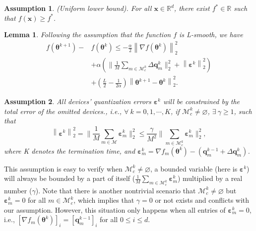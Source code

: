 \documentclass[lettersize,journal]{IEEEtran}
\newtheorem{assumption}{Assumption}
\newtheorem{lemma}{Lemma}
\begin{document}
\begin{assumption}(Uniform lower bound).
    \textit{For all $\boldsymbol{x} \in \mathbb{R}^{d}$, there exist $f^{*} \in \mathbb{R}$ such that $f(\boldsymbol{x}) \geq f^*$.}
\end{assumption}


\begin{lemma}
\textit{Following the assumption that the function $f$ is L-smooth, we have}
\begin{equation}
\begin{aligned}
f(\boldsymbol{\theta}^{k+1})-&f(\boldsymbol{\theta}^k)\leqslant-\frac{\alpha}{2}\left\|\nabla f(\boldsymbol{\theta}^k)\right\|_2^2
\\
&+\alpha \left(\bigg\|\frac{1}{M} \sum_{m \in \mathcal{M}_c^k} \Delta \boldsymbol{q}_{m}^{k} \bigg\|_2^2 + \left\|\boldsymbol{\varepsilon}^k\right\|_2^2\right)
\\
&+\left(\frac{L}{2}-\frac{1}{2\alpha}\right)\left\|\boldsymbol{\theta}^{k+1}-\boldsymbol{\theta}^k\right\|_2^2.
\label{delta_aquila}
\end{aligned}
\end{equation}
\end{lemma}

\begin{assumption}
    \label{assumption3}
    \textit{All devices' quantization errors $\boldsymbol{\varepsilon}^k$ will be constrained by the total error of the omitted devices., i.e., $\forall \ k = 0, 1, \cdots, K$, if $\mathcal{M}_c^k \neq \varnothing$, $\exists \ \gamma \geqslant 1$, such that}
\begin{equation}
\left\|\boldsymbol{\varepsilon}^k\right\|_2^2 = \bigg\|\frac{1}{M} \sum_{m \in \mathcal{M}} \boldsymbol{\varepsilon}_m^k\bigg\|_2^2 \leqslant \frac{\gamma }{M^2}\bigg\|\sum_{m \in \mathcal{M}_c^k} \boldsymbol{\varepsilon}_m^k\bigg\|_2^2,
\label{gamma_rule}
\end{equation}
where K denotes the termination time, and $\boldsymbol{\varepsilon}_m^k = \nabla f_m(\boldsymbol{\theta}^{k}) -\left(\boldsymbol{q}_{m}^{k-1} + \Delta \boldsymbol{q}_{m}^{k}\right)$.
\end{assumption}
This assumption is easy to verify when $\mathcal{M}_c^k \neq \varnothing$, a bounded variable (here is $\boldsymbol{\varepsilon}^k$) will always be bounded by a part of itself ($\frac{1}{M}\sum_{m \in \mathcal{M}_c^k} \boldsymbol{\varepsilon}_m^k$) multiplied by a real number ($\gamma$). Note that there is another nontrivial scenario that $\mathcal{M}_c^k \neq \varnothing$ but $\boldsymbol{\varepsilon}_m^k = 0$ for all $m \in \mathcal{M}_c^k$, which implies that $\gamma = 0$ or not exists and conflicts with our assumption. However, this situation only happens when all entries of $\boldsymbol{\varepsilon}_m^k = 0$, i.e., 
$[\nabla f_m(\boldsymbol{\theta}^k)]_i =[\boldsymbol{q}_{m}^{k-1}]_i$ for all $0 \leqslant i \leqslant d$.
\end{document}
